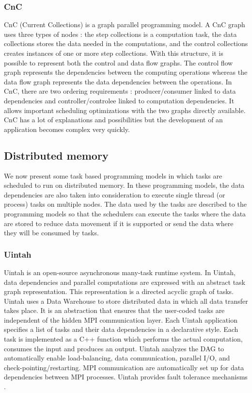 \subsubsection{CnC}
CnC \cite{ChaKV2010} \cite{BBCKL2010} (Current Collections) is a graph parallel programming model.
A CnC graph uses three types of nodes : the step collections is a computation task, the data collections stores the data needed in the computations, and the control collections creates instances of one or more step collections.
With this structure, it is possible to represent both the control and data flow graphs.
The control flow graph represents the dependencies between the computing operations whereas the data flow graph represents the data dependencies between the operations.
In CnC, there are two ordering requirements : producer/consumer linked to data dependencies and controller/controlee linked to computation dependencies.
It allows important scheduling optimizations with the two graphs directly available.
CnC has a lot of explanations and possibilities but the development of an application becomes complex very quickly.

\subsection{Distributed memory}
We now present some task based programming models in which tasks are scheduled to run on distributed memory.
In these programming models, the data dependencies are also taken into consideration to execute single thread (or process) tasks on multiple nodes.
The data used by the tasks are described to the programming models so that the schedulers can execute the tasks where the data are stored to reduce data movement if it is supported or send the data where they will be consumed by tasks.

\subsubsection{Uintah}
Uintah \cite{GeCPJ2000} \cite{HumpB2019} is an open-source asynchronous many-task runtime system.
In Uintah, data dependencies and parallel computations are expressed with an abstract task graph representation.
This representation is a directed acyclic graph of tasks.
Uintah uses a Data Warehouse to store distributed data in which all data transfer takes place.
It is an abstraction that ensures that the user-coded tasks are independent of the hidden MPI communication layer.
Each Uintah application specifies a list of tasks and their data dependencies in a declarative style.
Each task is implemented as a C++ function which performs the actual computation, consumes the input and produces an output.
Uintah analyzes the DAG to automatically enable load-balancing, data communication, parallel I/O, and check-pointing/restarting.
MPI communication are automatically set up for data dependencies between MPI processes.
Uintah provides fault tolerance mechanisms \cite{SahaB2019}.

